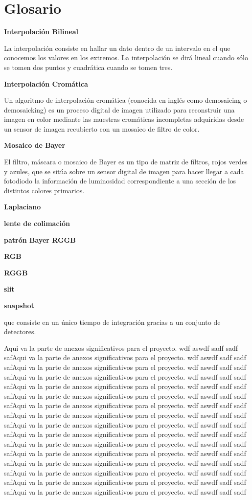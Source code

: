 \chapter{Glosario} %

\textbf{Interpolación Bilineal} 

La interpolación consiste en hallar un dato dentro de un intervalo en el que conocemos los valores en los extremos. La interpolación se dirá lineal cuando sólo se tomen dos puntos y cuadrática cuando se tomen tres.

\textbf{Interpolación Cromática} 

Un algoritmo de interpolación cromática (conocida en inglés como demosaicing o demosaicking) es un proceso digital de imagen utilizado para reconstruir una imagen en color mediante las muestras cromáticas incompletas adquiridas desde un sensor de imagen recubierto con un mosaico de filtro de color.

\textbf{Mosaico de Bayer} 

El filtro, máscara o mosaico de Bayer es un tipo de matriz de filtros, rojos verdes y azules, que se sitúa sobre un sensor digital de imagen para hacer llegar a cada fotodiodo la información de luminosidad correspondiente a una sección de los distintos colores primarios. 

\textbf{Laplaciano} 

\textbf{lente de colimación} 

\textbf{patrón Bayer RGGB} 

\textbf{RGB} 

\textbf{RGGB} 

\textbf{slit} 

\textbf{snapshot} 

que consiste en un único tiempo de integración gracias a un conjunto de detectores. 

Aqui va la parte de anexos significativos para el proyecto. wdf aswdf sadf sadf safAqui va la parte de anexos significativos para el proyecto. wdf aswdf sadf sadf safAqui va la parte de anexos significativos para el proyecto. wdf aswdf sadf sadf safAqui va la parte de anexos significativos para el proyecto. wdf aswdf sadf sadf safAqui va la parte de anexos significativos para el proyecto. wdf aswdf sadf sadf safAqui va la parte de anexos significativos para el proyecto. wdf aswdf sadf sadf safAqui va la parte de anexos significativos para el proyecto. wdf aswdf sadf sadf safAqui va la parte de anexos significativos para el proyecto. wdf aswdf sadf sadf safAqui va la parte de anexos significativos para el proyecto. wdf aswdf sadf sadf safAqui va la parte de anexos significativos para el proyecto. wdf aswdf sadf sadf safAqui va la parte de anexos significativos para el proyecto. wdf aswdf sadf sadf safAqui va la parte de anexos significativos para el proyecto. wdf aswdf sadf sadf safAqui va la parte de anexos significativos para el proyecto. wdf aswdf sadf sadf safAqui va la parte de anexos significativos para el proyecto. wdf aswdf sadf sadf safAqui va la parte de anexos significativos para el proyecto. wdf aswdf sadf sadf safAqui va la parte de anexos significativos para el proyecto. wdf aswdf sadf sadf 